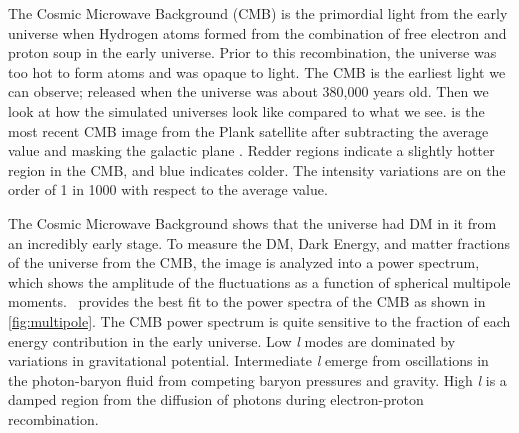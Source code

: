 The Cosmic Microwave Background (CMB) is the primordial light from the early universe when Hydrogen atoms formed from the combination of free electron and proton soup in the early universe.
Prior to this recombination, the universe was too hot to form atoms and was opaque to light.
The CMB is the earliest light we can observe; released when the universe was about 380,000 years old.
Then we look at how the simulated universes look like compared to what we see.
 is the most recent CMB image from the Plank satellite after subtracting the average value and masking the galactic plane \cite{Plank:CMB}.
Redder regions indicate a slightly hotter region in the CMB, and blue indicates colder.
The intensity variations are on the order of 1 in 1000 with respect to the average value.

\begin{figure}[ht]
\end{figure}

The Cosmic Microwave Background shows that the universe had DM in it from an incredibly early stage.
To measure the DM, Dark Energy, and matter fractions of the universe from the CMB, the image is analyzed into a power spectrum, which shows the amplitude of the fluctuations as a function of spherical multipole moments.
\lcdm~provides the best fit to the power spectra of the CMB as shown in \cref{fig:multipole}.
The CMB power spectrum is quite sensitive to the fraction of each energy contribution in the early universe.
Low \textit{l} modes are dominated by variations in gravitational potential.
Intermediate \textit{l} emerge from oscillations in the photon-baryon fluid from competing baryon pressures and gravity.
High \textit{l} is a damped region from the diffusion of photons during electron-proton recombination. \cite{Greene:cosmology_dm}


